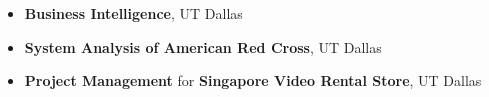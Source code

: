 \documentclass[11pt]{article}
\begin{document}
\begin{itemize}\addtolength{\itemsep}{-0.5\baselineskip}
	\item{\textbf{Business Intelligence}, UT Dallas} %
	\item{\textbf{System Analysis of American Red Cross}, UT Dallas} %
	\item{\textbf{Project Management} for \textbf{Singapore Video Rental Store}, UT 
	Dallas} %
\end{itemize}
\end{document}
